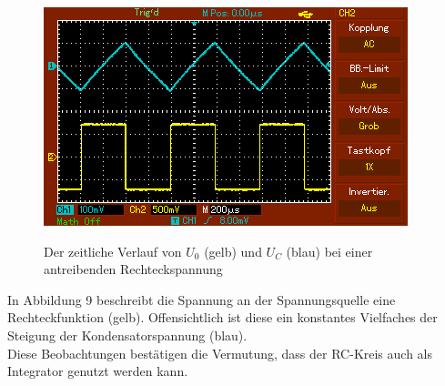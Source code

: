 	 \begin{figure}[H]
	 	\centering
	 	\caption{Der zeitliche Verlauf von $U_0$ (gelb) und $U_C$ (blau) bei einer antreibenden Rechteckspannung}
	 	\includegraphics[width=\linewidth-70pt,height=\textheight-70pt,keepaspectratio]{content/MAP004.png}
	 	\label{fig:Rechteck}
	 \end{figure}
	 In Abbildung 9 beschreibt die Spannung an der Spannungsquelle eine Rechteckfunktion (gelb). Offensichtlich ist diese ein konstantes Vielfaches der Steigung der Kondensatorspannung (blau).\\
	 
	 Diese Beobachtungen bestätigen die Vermutung, dass der RC-Kreis auch als Integrator genutzt werden kann.
	 
